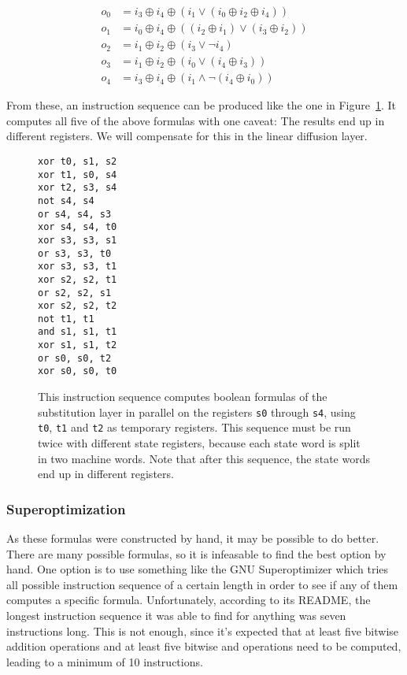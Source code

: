 \begin{samepage}
\begin{align*}
   o_0 & = i_3 \oplus i_4 \oplus (i_1 \vee (i_0 \oplus i_2 \oplus i_4))
\\ o_1 & = i_0 \oplus i_4 \oplus ((i_2 \oplus i_1) \vee (i_3 \oplus i_2))
\\ o_2 & = i_1 \oplus i_2 \oplus (i_3 \vee \neg i_4)
\\ o_3 & = i_1 \oplus i_2 \oplus (i_0 \vee (i_4 \oplus i_3))
\\ o_4 & = i_3 \oplus i_4 \oplus (i_1 \wedge \neg (i_4 \oplus i_0))
\end{align*}
\end{samepage}

From these, an instruction sequence can be produced like the one in
Figure~\ref{substitution}. It computes all five of the above formulas with one
caveat: The results end up in different registers. We will compensate
for this in the linear diffusion layer.

\begin{figure}
\begin{verbatim}
xor t0, s1, s2
xor t1, s0, s4
xor t2, s3, s4
not s4, s4
or s4, s4, s3
xor s4, s4, t0
xor s3, s3, s1
or s3, s3, t0
xor s3, s3, t1
xor s2, s2, t1
or s2, s2, s1
xor s2, s2, t2
not t1, t1
and s1, s1, t1
xor s1, s1, t2
or s0, s0, t2
xor s0, s0, t0
\end{verbatim}

\caption{This instruction sequence computes boolean formulas of the substitution
layer in parallel on the registers \texttt{s0} through \texttt{s4}, using
\texttt{t0}, \texttt{t1} and \texttt{t2} as temporary registers. This sequence
must be run twice with different state registers, because each state word is
split in two machine words. Note that after this sequence, the state words end
up in different registers.}
\label{substitution}
\end{figure}

\subsubsection{Superoptimization}

As these formulas were constructed by hand, it may be possible to do better.
There are many possible formulas, so it is infeasable to find the best option by
hand. One option is to use something like the GNU Superoptimizer which tries all
possible instruction sequence of a certain length in order to see if any of them
computes a specific formula. Unfortunately, according to its README, the longest
instruction sequence it was able to find for anything was seven instructions
long. This is not enough, since it's expected that at least five bitwise
addition operations and at least five bitwise and operations need to be
computed, leading to a minimum of 10 instructions.

